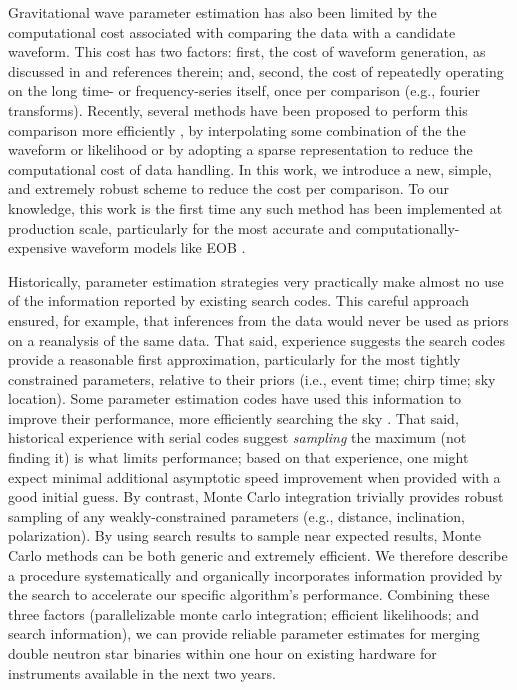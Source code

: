 Gravitational wave parameter estimation has also been limited by the computational cost associated with comparing the
data with a candidate waveform.  This cost has two factors: first, the cost of waveform generation, as discussed in
\cite{gwastro-mergers-PE-ReducedOrder-2013,2013PhRvD..87l2002S,2013PhRvD..87d4008C,gwastro-mergers-IMRPhenomP,gwastro-SpinTaylorF2-2013} and references therein; and, second,
the cost of repeatedly operating on the long time- or frequency-series itself, once per comparison (e.g., fourier
transforms).   
%
Recently, several methods have been proposed to perform this comparison more efficiently
\cite{gwastro-mergers-PE-ReducedOrder-2013,2013PhRvD..87l2002S,2013PhRvD..87d4008C,gw-astro-ReducedOrderQuadraturePE-TiglioEtAl2014}, by interpolating some combination
of the the waveform or likelihood or by adopting a sparse representation to reduce the computational cost of data
handling.  
%
In this work, we introduce a new, simple, and extremely robust scheme to reduce the cost per comparison.  
%
To our knowledge, this work is the first time any such method has been implemented at production scale, particularly for
the most accurate and computationally-expensive waveform models like EOB
\cite{gw-astro-EOBspin-Tarrachini2012,gw-astro-EOBNR-Calibrated-2009}.  


Historically, parameter estimation strategies very practically make almost no use of the information reported by
existing search codes.  This careful approach ensured, for example, that inferences from the data would never be used as priors on a
reanalysis of the same data.  
%
That said, experience suggests the search codes provide a reasonable first approximation, 
particularly for the most tightly constrained parameters, relative to their priors (i.e., event time; chirp time; sky location).  
%
Some parameter estimation codes have used this information to improve their performance, more efficiently searching the
sky \cite{2013APS..APRG10003F,2013arXiv1309.7709F}. %
That said, historical experience with serial codes suggest \emph{sampling} the maximum (not finding it) is what limits
performance; based on that experience, one might expect minimal additional asymptotic speed improvement when provided
with a good initial guess.
%
By contrast, Monte Carlo integration trivially provides robust sampling of any weakly-constrained parameters (e.g.,
distance, inclination, polarization).    By using search results to sample near expected results, Monte Carlo methods
can be both generic and extremely efficient.   We therefore describe a procedure systematically and organically incorporates information provided
by the search to accelerate our specific algorithm's performance.  
%
Combining these three factors (parallelizable monte carlo integration; efficient likelihoods; and search information),
we can provide reliable parameter estimates for merging double neutron star binaries within one hour on existing
hardware for instruments available in the next two years.


